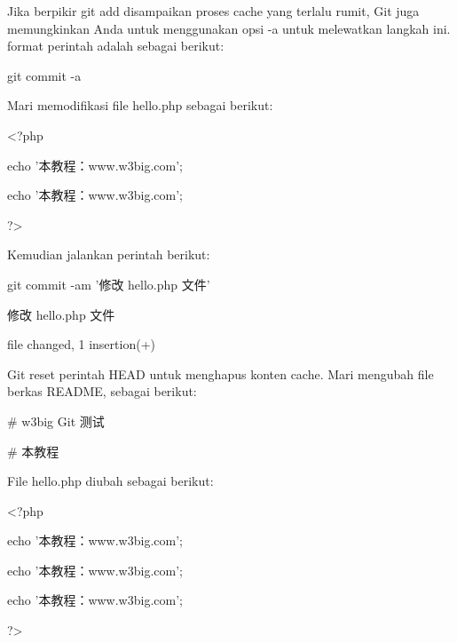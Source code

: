 Jika berpikir git add disampaikan proses cache yang terlalu rumit, Git juga memungkinkan Anda untuk menggunakan opsi -a untuk melewatkan langkah ini. format perintah adalah sebagai berikut: \par
\noindent 
{\fontsize{10pt}{10pt}\selectfont git commit -a} \par
\vspace{12pt}
\noindent 
Mari memodifikasi file hello.php sebagai berikut:  \par
\noindent 
{\fontsize{10pt}{10pt}\selectfont <?php} \par
\noindent 
{\fontsize{10pt}{10pt}\selectfont echo '本教程：www.w3big.com';} \par
\noindent 
{\fontsize{10pt}{10pt}\selectfont echo '本教程：www.w3big.com';} \par
\noindent 
{\fontsize{10pt}{10pt}\selectfont ?>} \par
\vspace{10pt}
\noindent 
Kemudian jalankan perintah berikut:  \par
\noindent 
{\fontsize{10pt}{10pt}\selectfont git commit -am '修改 hello.php 文件'} \par
\noindent 
{\fontsize{10pt}{10pt}\selectfont [master 71ee2cb] 修改 hello.php 文件} \par
\noindent 
{\fontsize{10pt}{10pt} file changed, 1 insertion(+)} \par
\vspace{10pt}
Git reset perintah HEAD untuk menghapus konten cache.  Mari mengubah file berkas README, sebagai berikut:  \par
\noindent 
{\fontsize{10pt}{10pt}\selectfont  $  \#  $ w3big Git 测试} \par
\noindent 
{\fontsize{10pt}{10pt}\selectfont  $  \#  $ 本教程 } \par
\vspace{12pt}
\noindent 
File hello.php diubah sebagai berikut:  \par
\noindent 
{\fontsize{10pt}{10pt}\selectfont <?php} \par
\noindent 
{\fontsize{10pt}{10pt}\selectfont echo '本教程：www.w3big.com';} \par
\noindent 
{\fontsize{10pt}{10pt}\selectfont echo '本教程：www.w3big.com';} \par
\noindent 
{\fontsize{10pt}{10pt}\selectfont echo '本教程：www.w3big.com';} \par
\noindent 
{\fontsize{10pt}{10pt}\selectfont ?>} \par
\vspace{10pt}
